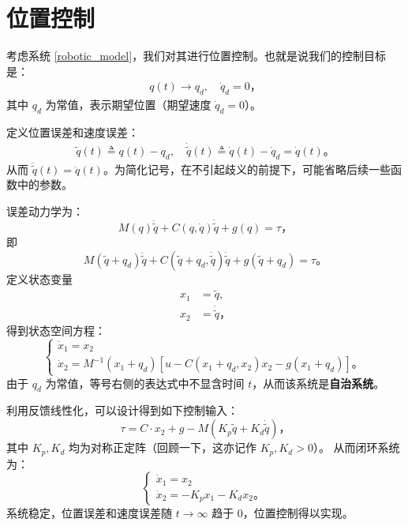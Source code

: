 \section{位置控制}\label{6Bref}

考虑系统 \eqref{robotic_model}，我们对其进行位置控制。也就是说我们的控制目标是：
\begin{align*}
    q(t) \to q_d, \quad \dot{q}_d = 0 \text{，}
\end{align*}
其中 $q_d$ 为常值，表示期望位置（期望速度 $\dot{q}_d = 0$）。

定义位置误差和速度误差：
\begin{align*}
    \tilde{q}(t) \triangleq q(t) - q_d, \quad \dot{\tilde{q}}(t) \triangleq \dot{q}(t) - \dot{q}_d = \dot{q}(t) \text{。}
\end{align*}
从而 $\ddot{\tilde{q}}(t) = \ddot{q}(t)$。为简化记号，在不引起歧义的前提下，可能省略后续一些函数中的参数。

误差动力学为：
\begin{equation*}
    M (q) \ddot{\tilde{q}} + C (q, \dot{q}) \dot{\tilde{q}} + g(q) = \tau \text{，}
\end{equation*}
即
\begin{equation}
    M (\tilde{q} + q_d) \ddot{\tilde{q}} + C (\tilde{q} + q_d, \dot{\tilde{q}}) \dot{\tilde{q}} + g(\tilde{q} + q_d) = \tau \text{。}
\end{equation}
定义状态变量
\begin{align*}
    x_1 &= \tilde{q}, \\
    x_2 &= \dot{\tilde{q}} \text{，}
\end{align*}
得到状态空间方程：
\begin{equation} \label{robotic_state_space}
    \begin{cases}
        \dot{x}_1 = x_2\\
        \dot{x}_2 = M^{- 1} (x_1 + q_d) [u - C (x_1 + q_d, x_2) x_2 - g (x_1 + q_d)] \text{。}
    \end{cases}
\end{equation}
由于 $q_d$ 为常值，等号右侧的表达式中不显含时间 $t$，从而该系统是\textbf{自治系统}。

利用反馈线性化，可以设计得到如下控制输入：
\begin{equation} \label{robotic_control_1}
    \tau = C \cdot x_2 + g - M (K_p \tilde{q} + K_d \dot{\tilde{q}})\text{，}
\end{equation}
其中 $K_p, K_d$ 均为对称正定阵（回顾一下，这亦记作 $K_p, K_d > 0$）。
从而闭环系统为：
\[
    \begin{cases}
        \dot{x}_1 = x_2\\
        \dot{x}_2 = - K_p x_1 - K_d x_2 \text{。}
    \end{cases}
\]
系统稳定，位置误差和速度误差随 $t \to \infty$ 趋于 $0$，位置控制得以实现。

